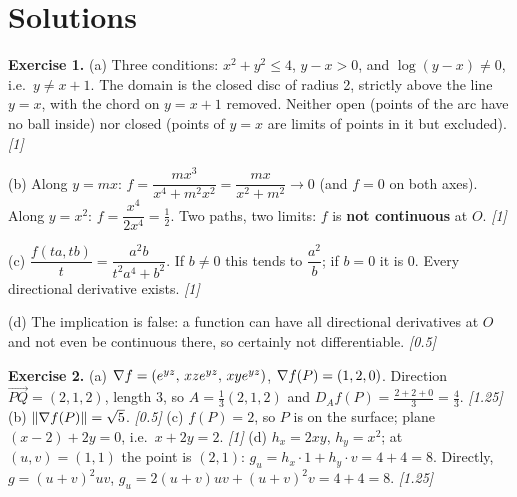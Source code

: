 \clearpage
\section*{Solutions}

\textbf{Exercise 1.}
(a) Three conditions: $x^2+y^2\le4$, $y-x>0$, and $\log(y-x)\ne0$, i.e.\ $y\ne x+1$. The domain is
the closed disc of radius 2, strictly above the line $y=x$, with the chord on $y=x+1$ removed.
Neither open (points of the arc have no ball inside) nor closed (points of $y=x$ are limits of
points in it but excluded). \hfill\emph{[1]}
\begin{center}
\end{center}
(b) Along $y=mx$: $f=\dfrac{mx^3}{x^4+m^2x^2}=\dfrac{mx}{x^2+m^2}\to0$ (and $f=0$ on both axes).
Along $y=x^2$: $f=\dfrac{x^4}{2x^4}=\tfrac12$. Two paths, two limits: $f$ is \textbf{not continuous} at $O$. \hfill\emph{[1]}

(c) $\dfrac{f(ta,tb)}t=\dfrac{a^2b}{t^2a^4+b^2}$. If $b\ne0$ this tends to $\dfrac{a^2}b$; if $b=0$ it is
$0$. Every directional derivative exists. \hfill\emph{[1]}

(d) The implication is false: a function can have all directional derivatives at $O$ and not
even be continuous there, so certainly not differentiable. \hfill\emph{[0.5]}

\textbf{Exercise 2.}
(a) $\nabla f=(e^{yz},\,xze^{yz},\,xye^{yz})$, $\nabla f(P)=(1,2,0)$. Direction
$\overrightarrow{PQ}=(2,1,2)$, length $3$, so $A=\frac13(2,1,2)$ and $D_Af(P)=\frac{2+2+0}3=\frac43$. \hfill\emph{[1.25]}
(b) $\left\lVert \nabla f(P)\right\rVert=\sqrt5$. \hfill\emph{[0.5]}
(c) $f(P)=2$, so $P$ is on the surface; plane $(x-2)+2y=0$, i.e.\ $x+2y=2$. \hfill\emph{[1]}
(d) $h_x=2xy$, $h_y=x^2$; at $(u,v)=(1,1)$ the point is $(2,1)$: $g_u=h_x\cdot1+h_y\cdot v=4+4=8$.
Directly, $g=(u+v)^2uv$, $g_u=2(u+v)uv+(u+v)^2v=4+4=8$. \hfill\emph{[1.25]}

